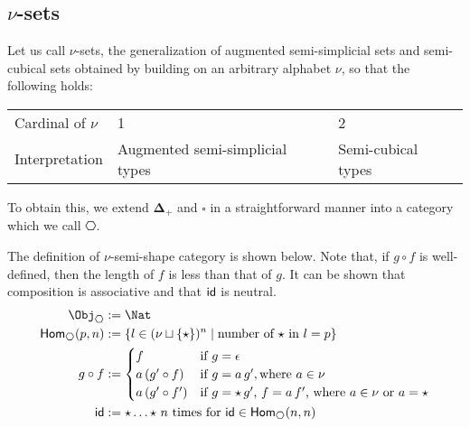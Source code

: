 \documentclass{msc}
\newcommand{\DeltaPlus}{\ensuremath{\boldsymbol{\Delta}_+}}
\newcommand{\Cube}{\ensuremath{\boldsymbol{{\square}}}}
\newcommand{\kstar}{{\star}}
\def\graymidrule{\arrayrulecolor{gray30}\midrule\arrayrulecolor{gray65}}
\begin{document}
\subsection*{\texorpdfstring{$\nu$}{ν}-sets}
Let us call $\nu$-sets, the generalization of augmented semi-simplicial sets and semi-cubical sets obtained by building on an arbitrary alphabet $\nu$, so that the following holds:

\begin{center}
  \begin{tabularx}{0.7\linewidth}{X|X|X}
    \toprule
    Cardinal of $\nu$ & 1                               & 2                  \\
    \graymidrule
    Interpretation    & Augmented semi-simplicial types & Semi-cubical types \\
    \bottomrule
  \end{tabularx}
\end{center}

To obtain this, we extend $\DeltaPlus$ and $\Cube$ in a straightforward manner into a category which we call $\hexagon$.

\begin{definition}[$\hexagon$]
  The definition of $\nu$-semi-shape category is shown below. Note that, if $g \circ f$ is well-defined, then the length of $f$ is less than that of $g$. It can be shown that composition is associative and that $\mathsf{id}$ is neutral.
  \begin{align*}
    \Obj_{\hexagon}       & := \Nat                                                                           \\
    \Hom_{\hexagon}(p, n) & := \{l \in (\nu \sqcup \{\kstar\})^n \mid \text{number of $\kstar$ in $l = p$}\}    \\
    g \circ f             & :=
    \begin{cases}
      f                  & \text{if $g = \epsilon$}                                                                 \\
      a\,(g' \circ f)  & \text{if $g = a\,g'$}, \text{where $a \in \nu$}                                \\
      a\,(g' \circ f') & \text{if $g = \kstar\,g'$, $f = a\,f'$, where $a \in \nu$ or $a = \kstar$} \\
    \end{cases}   \\
    \id                   & := \kstar \ldots \kstar \text{ $n$ times for $\id \in \Hom_{\hexagon}(n, n)$}
  \end{align*}
\end{definition}
\end{document}
